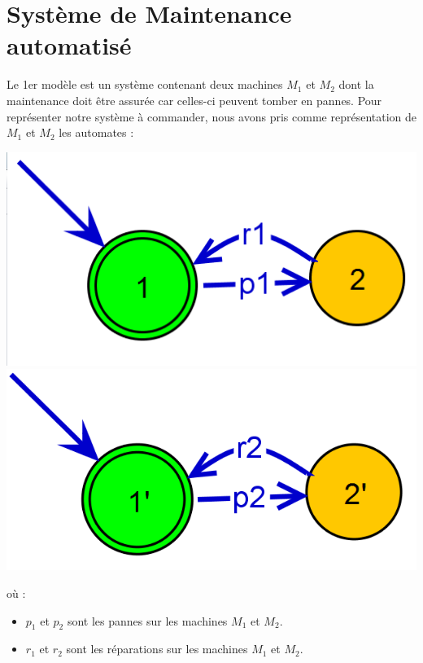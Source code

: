 \chapter{Système de Maintenance automatisé}
Le 1er modèle est un système contenant deux machines $M_1$ et $M_2$ dont la maintenance doit être assurée car celles-ci peuvent tomber en pannes. Pour représenter notre système à commander, nous avons pris comme représentation de  $M_1$ et $M_2$ les automates :
\begin{center}
\includegraphics[scale=0.3]{I/images/M1.png}
\includegraphics[scale=0.3]{I/images/M2.png}
\end{center}
où : \begin{itemize}[label = \textbullet]
\item $p_1$ et $p_2$ sont les pannes sur les machines $M_1$ et $M_2$.
\item $r_1$ et $r_2$ sont les réparations sur les machines $M_1$ et $M_2$.
\end{itemize}


